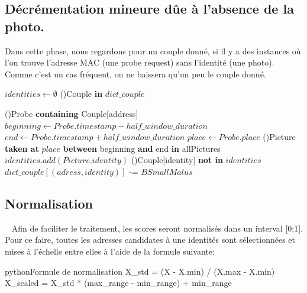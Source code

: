 \subsection{Décrémentation mineure dûe à l'absence de la photo.}
Dans cette phase, nous regardons pour un couple donné, si il y a des instances où l'on trouve 
l'adresse MAC (une probe request) sans l'identité (une photo). Comme c'est un cas fréquent, on ne baissera qu'un peu le couple donné. 


\begin{algorithm2e}[H]
	\SetAlgoLined
	$identities  \gets \emptyset $\;
	\ForEach(){Couple \textbf{in} $dict\_couple$}{
		 \ForEach(){Probe \textbf{containing} Couple[address]}{
			$beginning \gets Probe.timestamp - half\_window\_duration$\;
			$end \gets Probe.timestamp + half\_window\_duration$\;
			$place \gets Probe.place$\; 
			\ForEach(){Picture \textbf{taken at} $place$ \textbf{between} beginning \textbf{and} end \textbf{in} allPictures}{
				$identities.add(Picture.identity)$
			 }
			}
		\If(){Couple[identity] \textbf{not in} $identities$}{
			$dict\_couple[(adress, identity)]$ -= $BSmallMalus$\;
		}

		}
	\caption{Décrémentation mineure dûe à l'absence de la photo}
\end{algorithm2e}

\subsection{Normalisation}~\cite{SKLEARNMINMAX}
Afin de faciliter le traitement, les scores seront normalisés dans un interval [0;1].
Pour ce faire, toutes les adresses candidates à une identités sont sélectionnées et mises à l'échelle entre elles à l'aide de la formule suivante:

\begin{listingsbox}{python}{Formule de normalisation}
X_std = (X - X.min) / (X.max - X.min)
X_scaled = X_std * (max_range - min_range) + min_range
\end{listingsbox}